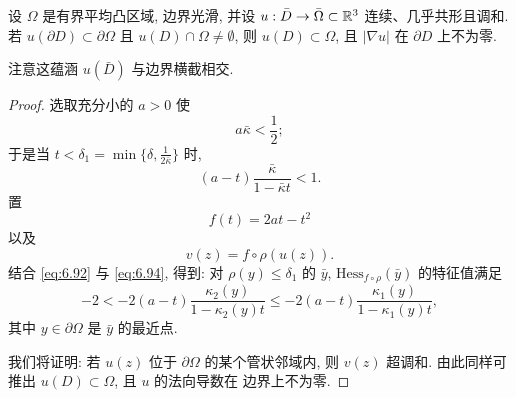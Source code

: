 \begin{lemma}
\label{lem:6.26}
设 $\Omega$ 是有界平均凸区域, 边界光滑, 并设
$u:\bar{D}\to\bar{\Omega}\subset\mathbb{R}^3$ 连续、几乎共形且调和. 若
$u(\partial D)\subset\partial\Omega$ 且 $u(D)\cap\Omega\neq\emptyset$,
则 $u(D)\subset\Omega$, 且 $|\nabla u|$ 在 $\partial D$ 上不为零.
\end{lemma}

注意这蕴涵 $u(\bar{D})$ 与边界横截相交.

\begin{proof}
选取充分小的 $a>0$ 使
\begin{equation}
a\bar{\kappa}<\frac12;
\label{eq:6.93}
\end{equation}
于是当 $t<\delta_1=\min\{\delta,\frac{1}{2\bar{\kappa}}\}$ 时,
\begin{equation}
(a-t)\frac{\bar{\kappa}}{1-\bar{\kappa}t}<1.
\label{eq:6.94}
\end{equation}
置
\begin{equation}
f(t)=2at-t^2
\label{eq:6.95}
\end{equation}
以及
\begin{equation}
v(z)=f\circ\rho(u(z)).
\label{eq:6.96}
\end{equation}
结合 \eqref{eq:6.92} 与 \eqref{eq:6.94}, 得到: 对 $\rho(y)\leq\delta_1$
的 $\bar{y}$, $\mathrm{Hess}_{f\circ\rho}(\bar{y})$ 的特征值满足
\begin{equation}
-2<-2(a-t)\frac{\kappa_2(y)}{1-\kappa_2(y)t}
\leq-2(a-t)\frac{\kappa_1(y)}{1-\kappa_1(y)t},
\label{eq:6.97}
\end{equation}
其中 $y\in\partial\Omega$ 是 $\bar{y}$ 的最近点.

我们将证明: 若 $u(z)$ 位于 $\partial\Omega$ 的某个管状邻域内, 则
$v(z)$ 超调和. 由此同样可推出 $u(D)\subset\Omega$, 且 $u$ 的法向导数在
边界上不为零.


\end{proof}

